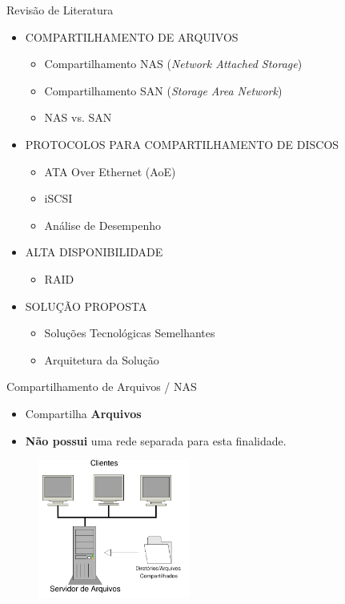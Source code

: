 \documentclass{beamer}
\begin{document}
\begin{frame}{Revisão de Literatura}
\begin{itemize}
	\item COMPARTILHAMENTO DE ARQUIVOS
		\begin{itemize}
		\item Compartilhamento NAS (\textit{Network Attached Storage})
		\item Compartilhamento SAN (\textit{Storage Area Network})
		\item NAS vs. SAN
		\end{itemize}
	\item PROTOCOLOS PARA COMPARTILHAMENTO DE DISCOS
		\begin{itemize}
		\item ATA Over Ethernet (AoE)
		\item iSCSI
		\item Análise de Desempenho
		\end{itemize}
	\item ALTA DISPONIBILIDADE
		\begin{itemize}
		\item RAID
		\end{itemize}
	\item SOLUÇÃO PROPOSTA
		\begin{itemize}
		\item Soluções Tecnológicas Semelhantes
		\item Arquitetura da Solução
		\end{itemize}
\end{itemize}
\end{frame}

\begin{frame}{Compartilhamento de Arquivos / NAS}
\begin{itemize}
	\item Compartilha \textbf{Arquivos}
	\item \textbf{Não possui} uma rede separada para esta finalidade.
\end{itemize}
\begin{figure}[h]
\centering
\includegraphics[width=5cm]{img/nas.pdf} 
 \label{fig-nas}
\end{figure}
\end{frame}
\end{document}
